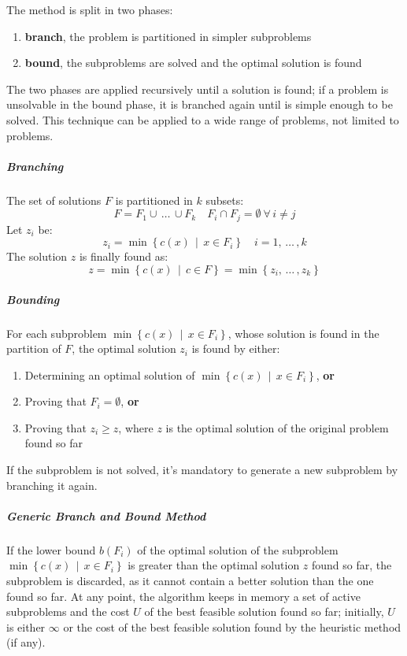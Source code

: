 \documentclass[english]{article}
\begin{document}
The method is split in two phases:

\begin{enumerate}[label=phase \arabic*., ref=step \arabic*, leftmargin=*, widest*=8, labelindent=1em]
  \item \textbf{branch}, the problem is partitioned in simpler subproblems
  \item \textbf{bound}, the subproblems are solved and the optimal solution is found
\end{enumerate}

The two phases are applied recursively until a solution is found;
if a problem is unsolvable in the bound phase, it is branched again until is simple enough to be solved.
This technique can be applied to a wide range of problems, not limited to \ILP problems.

\subparagraph*{Branching}

The set of solutions \(F\) is partitioned in \(k\) subsets:
\[ F = F_1 \cup \, \ldots \, \cup F_k \quad F_i \cap F_j = \emptyset \ \forall \, i \neq j \]
Let \(z_i\) be:
\[ z_i = \min\left\{ c(x) \,\middle\vert\, x \in F_i \right\} \quad i = 1, \, \ldots \, , k \]
The solution \(z\) is finally found as:
\[ z = \min\left\{ c(x) \,\middle\vert\, c \in F \right\} = \min\left\{ z_i, \, \ldots \,, z_k \right\} \]

\subparagraph*{Bounding}

For each subproblem \(\min\left\{ c(x) \,\middle\vert\, x \in F_i \right\}\), whose solution is found in the partition of \(F\), the optimal solution \(z_i\) is found by either:

\begin{enumerate}
  \item Determining an optimal solution of \(\min\left\{ c(x) \,\middle\vert\, x \in F_i \right\}\), \textbf{or}
  \item Proving that \(F_i = \emptyset\), \textbf{or}
  \item Proving that \(z_i \geq z\), where \(z\) is the optimal solution of the original problem found so far
\end{enumerate}

If the subproblem is not solved, it's mandatory to generate a new subproblem by branching it again.

\subparagraph*{Generic Branch and Bound Method}

If the lower bound \(b(F_i)\) of the optimal solution of the subproblem \(\min\left\{ c(x) \,\middle\vert\, x \in F_i \right\}\) is greater than the optimal solution \(z\) found so far, the subproblem is discarded, as it cannot contain a better solution than the one found so far.
At any point, the algorithm keeps in memory a set of active subproblems and the cost \(U\) of the best feasible solution found so far;
initially, \(U\) is either \(\infty\) or the cost of the best feasible solution found by the heuristic method (if any).
\end{document}

